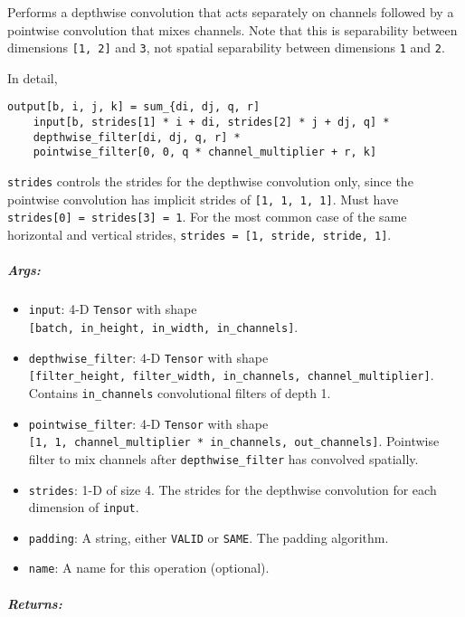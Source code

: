 Performs a depthwise convolution that acts separately on channels
followed by a pointwise convolution that mixes channels. Note that this
is separability between dimensions \texttt{{[}1,\ 2{]}} and \texttt{3},
not spatial separability between dimensions \texttt{1} and \texttt{2}.

In detail,

\begin{verbatim}
output[b, i, j, k] = sum_{di, dj, q, r]
    input[b, strides[1] * i + di, strides[2] * j + dj, q] *
    depthwise_filter[di, dj, q, r] *
    pointwise_filter[0, 0, q * channel_multiplier + r, k]
\end{verbatim}

\texttt{strides} controls the strides for the depthwise convolution
only, since the pointwise convolution has implicit strides of
\texttt{{[}1,\ 1,\ 1,\ 1{]}}. Must have
\texttt{strides{[}0{]}\ =\ strides{[}3{]}\ =\ 1}. For the most common
case of the same horizontal and vertical strides,
\texttt{strides\ =\ {[}1,\ stride,\ stride,\ 1{]}}.

\subparagraph{Args: }\label{args-9}

\begin{itemize}
\tightlist
\item
  \texttt{input}: 4-D \texttt{Tensor} with shape
  \texttt{{[}batch,\ in\_height,\ in\_width,\ in\_channels{]}}.
\item
  \texttt{depthwise\_filter}: 4-D \texttt{Tensor} with shape
  \texttt{{[}filter\_height,\ filter\_width,\ in\_channels,\ channel\_multiplier{]}}.
  Contains \texttt{in\_channels} convolutional filters of depth 1.
\item
  \texttt{pointwise\_filter}: 4-D \texttt{Tensor} with shape
  \texttt{{[}1,\ 1,\ channel\_multiplier\ *\ in\_channels,\ out\_channels{]}}.
  Pointwise filter to mix channels after \texttt{depthwise\_filter} has
  convolved spatially.
\item
  \texttt{strides}: 1-D of size 4. The strides for the depthwise
  convolution for each dimension of \texttt{input}.
\item
  \texttt{padding}: A string, either
  \texttt{\textquotesingle{}VALID\textquotesingle{}} or
  \texttt{\textquotesingle{}SAME\textquotesingle{}}. The padding
  algorithm.
\item
  \texttt{name}: A name for this operation (optional).
\end{itemize}

\subparagraph{Returns: }\label{returns-9}

